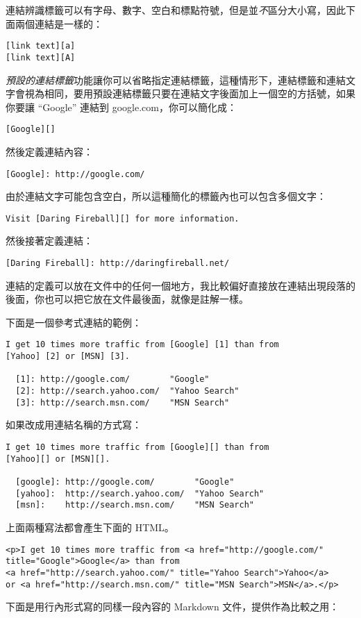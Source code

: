 連結辨識標籤可以有字母、數字、空白和標點符號，但是並\emph{不}區分大小寫，因此下面兩個連結是一樣的：

\begin{verbatim}
[link text][a]
[link text][A]
\end{verbatim}
\emph{預設的連結標籤}功能讓你可以省略指定連結標籤，這種情形下，連結標籤和連結文字會視為相同，要用預設連結標籤只要在連結文字後面加上一個空的方括號，如果你要讓
``Google'' 連結到 google.com，你可以簡化成：

\begin{verbatim}
[Google][]
\end{verbatim}
然後定義連結內容：

\begin{verbatim}
[Google]: http://google.com/
\end{verbatim}
由於連結文字可能包含空白，所以這種簡化的標籤內也可以包含多個文字：

\begin{verbatim}
Visit [Daring Fireball][] for more information.
\end{verbatim}
然後接著定義連結：

\begin{verbatim}
[Daring Fireball]: http://daringfireball.net/
\end{verbatim}
連結的定義可以放在文件中的任何一個地方，我比較偏好直接放在連結出現段落的後面，你也可以把它放在文件最後面，就像是註解一樣。

下面是一個參考式連結的範例：

\begin{verbatim}
I get 10 times more traffic from [Google] [1] than from
[Yahoo] [2] or [MSN] [3].

  [1]: http://google.com/        "Google"
  [2]: http://search.yahoo.com/  "Yahoo Search"
  [3]: http://search.msn.com/    "MSN Search"
\end{verbatim}
如果改成用連結名稱的方式寫：

\begin{verbatim}
I get 10 times more traffic from [Google][] than from
[Yahoo][] or [MSN][].

  [google]: http://google.com/        "Google"
  [yahoo]:  http://search.yahoo.com/  "Yahoo Search"
  [msn]:    http://search.msn.com/    "MSN Search"
\end{verbatim}
上面兩種寫法都會產生下面的 HTML。

\begin{verbatim}
<p>I get 10 times more traffic from <a href="http://google.com/"
title="Google">Google</a> than from
<a href="http://search.yahoo.com/" title="Yahoo Search">Yahoo</a>
or <a href="http://search.msn.com/" title="MSN Search">MSN</a>.</p>
\end{verbatim}
下面是用行內形式寫的同樣一段內容的 Markdown 文件，提供作為比較之用：

